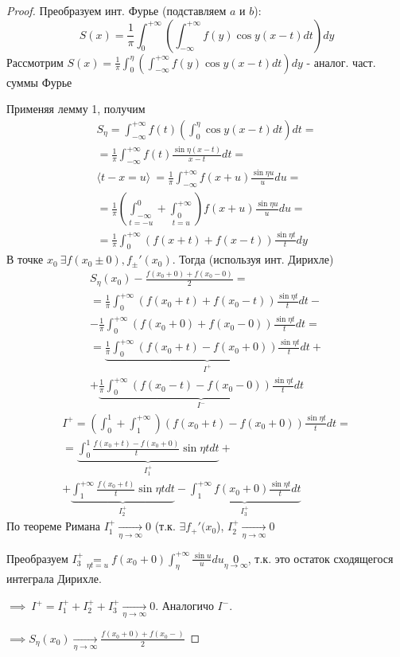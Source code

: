 \documentclass{article}
\begin{document}
\begin{proof}
  Преобразуем инт. Фурье (подставляем $a$ и $b$):
  \[
    S(x)=\frac{1}{\pi}\int_{0}^{+\infty}\left(\int_{-\infty}^{+\infty}f(y)\cos y (x-t)dt\right)dy
  \]
  Рассмотрим $S(x)=\frac{1}{\pi}\int_{0}^{\eta}\left(\int_{-\infty}^{+\infty}f(y)\cos y (x-t)dt\right)dy$ - аналог. част. суммы Фурье

  Применяя лемму 1, получим
  \begin{gather*}
    S_\eta=\int_{-\infty}^{+\infty}f(t)\left(\int_{0}^{\eta}\cos y(x-t)dt\right)dt  = \\
    = \frac{1}{\pi}\int_{-\infty}^{+\infty}f(t)\frac{\sin \eta(x-t)}{x-t}dt = \\ 
    \langle t-x=u \rangle \ =\frac{1}{\pi}\int_{-\infty}^{+\infty}f(x+u)\frac{\sin \eta u}{u}du= \\ 
    = \frac{1}{\pi}\left(\underset{t=-u}{\int_{-\infty}^{0}}+\underset{t=u}{\int_{0}^{+\infty}}\right)f(x+u)\frac{\sin \eta u}{u}du =  \\ 
    = \frac{1}{\pi}\int_{0}^{+\infty}(f(x+t)+f(x-t))\frac{\sin \eta t}{t}dy
  \end{gather*}
  В точке $x_0 \ \exists f(x_0\pm 0), f_{\pm}'(x_0)$. Тогда (используя инт. Дирихле)
  \begin{gather*}
    S_\eta(x_0)-\frac{f(x_0+0)+f(x_0-0)}{2}= \\ 
    = \frac{1}{\pi}\int_{0}^{+\infty}(f(x_0+t)+f(x_0-t))\frac{\sin \eta t}{t}dt - \\ -  \frac{1}{\pi}\int_{0}^{+\infty}(f(x_0+0)+f(x_0-0))\frac{\sin \eta t}{t}dt = \\ 
    = \underbrace{\frac{1}{\pi}\int_{0}^{+\infty}(f(x_0+t)-f(x_0+0))\frac{\sin \eta t}{t}dt}_{I^{+}} + \\ + \underbrace{\frac{1}{\pi}\int_{0}^{+\infty}(f(x_0-t)-f(x_0-0))\frac{\sin \eta t}{t}dt}_{I^{-}}
  \end{gather*}
  \begin{gather*}
    I^{+}=\left(\int_{0}^{1}+\int_{1}^{+\infty}\right)(f(x_0+t)-f(x_0+0))\frac{\sin\eta t}{t}dt = \\ 
    = \underbrace{\int_{0}^{1}\frac{f(x_0+t)-f(x_0+0)}{t}\sin \eta t dt}_{I^{+}_{1}} + \\ + \underbrace{\int_{1}^{+\infty}\frac{f(x_0+t)}{t}\sin \eta t dt}_{I_{2}^{+}} - \underbrace{\int_{1}^{+\infty}f(x_0+0)\frac{\sin \eta t}{t}dt}_{I_{3}^{+}}
  \end{gather*}
  По теореме Римана $I_{1}^{+} \underset{\eta \to \infty}{\to } 0$ (т.к. $\exists f_{+}'(x_0$), $I_{2}^{+} \underset{\eta \to \infty}{\to } 0$

  Преобразуем $I_{3}^{+}\underset{\eta t = u}{=}f(x_0+0)\int_{\eta}^{+\infty}\frac{\sin u}{u}du \underset{\eta\to \infty}{0}$,
  т.к. это остаток сходящегося интеграла Дирихле.

  $\implies \ I^{+}=I_{1}^{+}+ I_{2}^{+} + I_{3}^{+} \underset{\eta \to \infty}{\to} 0$. Аналогичо $I^{-}$.

  $\implies S_\eta(x_0) \underset{\eta \to \infty}{\to} \frac{f(x_0+0)+f(x_0-)}{2}$
\end{proof}
\end{document}
